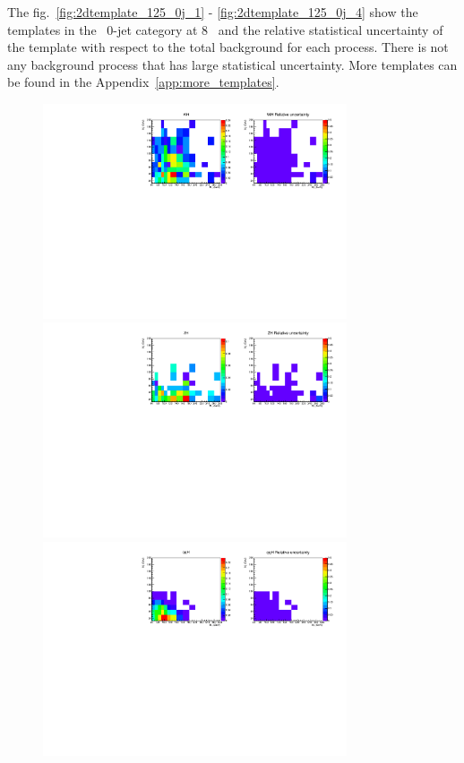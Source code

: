 The fig.~\ref{fig:2dtemplate_125_0j_1} - \ref{fig:2dtemplate_125_0j_4} show the templates 
in the \DF\ 0-jet category at 8 \TeV\
and the relative statistical uncertainty of the template with respect to the total background 
for each process. 
There is not any background process that has large statistical uncertainty.
More templates can be found in the Appendix~\ref{app:more_templates}.

\begin{figure}[htp]
\centering
\includegraphics[width=0.8\textwidth]{figures/2dtemplate_WH_mH125_0j.pdf}
\includegraphics[width=0.8\textwidth]{figures/2dtemplate_ZH_mH125_0j.pdf}
\includegraphics[width=0.8\textwidth]{figures/2dtemplate_qqH_mH125_0j.pdf}

\end{figure}
